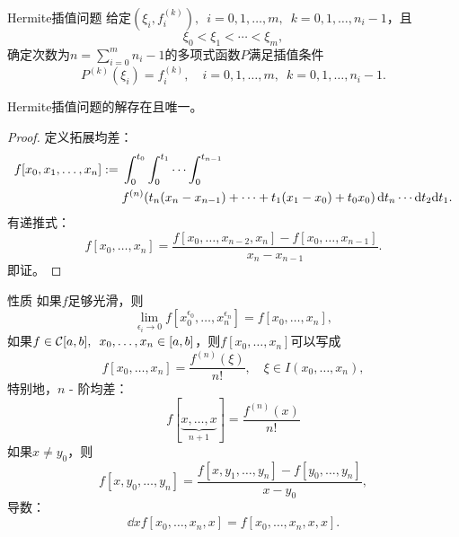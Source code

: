 \begin{definition}
    {Hermite插值问题}{}
    给定$(\xi_i,f_i^{(k)}),\enspace i=0,1,\ldots,m,\enspace k=0,1,\ldots,n_i-1$，且
    \[
        \xi_0<\xi_1<\cdots<\xi_m,
    \]
    确定次数为$n=\sum_{i=0}^mn_i-1$的多项式函数$P$满足插值条件
    \begin{equation}
        P^{(k)}(\xi_i)=f_i^{(k)},\quad i=0,1,\ldots,m,\enspace k=0,1,\ldots,n_i-1.
    \end{equation}
\end{definition}

\begin{theorem}
    {}{}
    Hermite插值问题的解存在且唯一。
\end{theorem}

\begin{proof}
    定义拓展均差：
    \begin{equation}
        \begin{aligned}
            f[x_0,x_1,\ldots,x_n]:={}&\int_0^{t_0}\int_0^{t_1}\cdots\int_0^{t_{n-1}}\\
            &f^{(n)}(t_n(x_n-x_{n-1})+\cdots+t_1(x_1-x_0)+t_0x_0)\mathop{}\!\mathrm{d} t_n\cdots\mathrm{d} t_2\mathrm{d} t_1.
        \end{aligned}
    \end{equation}
    有递推式：
    \begin{equation}
        f[x_0,\ldots,x_n]=\frac{f[x_0,\ldots,x_{n-2},x_n]-f[x_0,\ldots,x_{n-1}]}{x_n-x_{n-1}}.
    \end{equation}
    即证。
\end{proof}
\begin{theorem}
    {性质}{}
    如果$f$足够光滑，则
    \begin{equation}
        \lim_{\epsilon_i\to0}f[x_0^{\epsilon_0},\ldots,x_n^{\epsilon_n}]=f[x_0,\ldots,x_n],
    \end{equation}
    如果$f\in\mathcal C[a,b],\enspace x_0,\ldots,x_n\in[a,b]$，则$f[x_0,\ldots,x_n]$可以写成
    \begin{equation}
        f[x_0,\ldots,x_n]=\frac{f^{(n)}(\xi)}{n!},\quad\xi\in I(x_0,\ldots,x_n),
    \end{equation}
    特别地，$n$ - 阶均差：
    \begin{equation}
        f[\underbrace{x,\ldots,x}_{n+1}]=\frac{f^{(n)}(x)}{n!}
    \end{equation}
    如果$x\neq y_0$，则
    \begin{equation}
        f[x,y_0,\ldots,y_n]=\frac{f[x,y_1,\ldots,y_n]-f[y_0,\ldots,y_n]}{x-y_0},
    \end{equation}
    导数：
    \begin{equation}
        \dd xf[x_0,\ldots,x_n,x]=f[x_0,\ldots,x_n,x,x].
    \end{equation}
\end{theorem}

